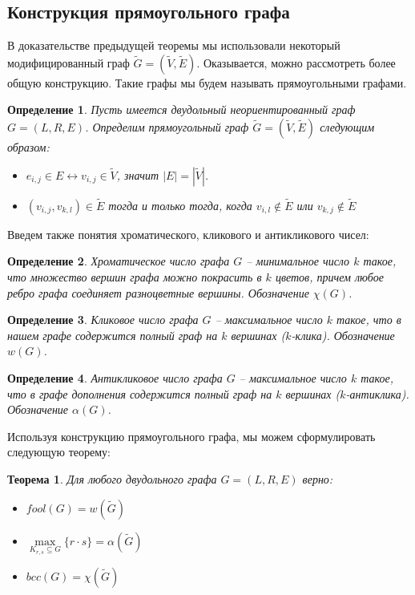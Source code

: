 \documentclass[a4paper]{article}
\newtheorem*{mdefinition}{Определение}
\newtheorem*{mtheorem}{Теорема}
\begin{document}
\subsection{Конструкция прямоугольного графа}

В доказательстве предыдущей теоремы мы использовали некоторый модифицированный граф $\widetilde{G} = 
(\widetilde{V}, \widetilde{E})$. Оказывается, можно рассмотреть более общую конструкцию. Такие графы 
мы будем называть прямоугольными графами.
\begin{mdefinition}
    Пусть имеется двудольный неориентированный граф $G = (L, R, E)$. Определим прямоугольный граф 
    $\widetilde{G} = (\widetilde{V}, \widetilde{E})$ следующим образом:
    \begin{itemize}
        \item $e_{i,j}\in E \leftrightarrow v_{i,j}\in \widetilde{V}$, значит $|E| = |\widetilde{V}|$.
        \item $(v_{i,j}, v_{k, l}) \in \widetilde{E}$ тогда и только тогда, когда $v_{i,l}\notin \widetilde{E}$ 
        или $v_{k,j}\notin\widetilde{E}$
    \end{itemize}
\end{mdefinition}

Введем также понятия хроматического, кликового и антикликового чисел:
\begin{mdefinition}

    Хроматическое число графа $G$ -- минимальное число $k$ такое, что множество вершин графа можно 
    покрасить в $k$ цветов, причем любое ребро графа соединяет разноцветные вершины. Обозначение $\chi(G)$.
\end{mdefinition}
\begin{mdefinition} 
    Кликовое число графа $G$ -- максимальное число $k$ такое, что в нашем графе содержится полный 
    граф на $k$ вершинах ($k$-клика). Обозначение $w(G)$.
\end{mdefinition}
\begin{mdefinition} 
    Антикликовое число графа $G$ -- максимальное число $k$ такое, что в графе дополнения содержится 
    полный граф на $k$ вершинах ($k$-антиклика). Обозначение $\alpha(G)$.
\end{mdefinition}


Используя конструкцию прямоугольного графа, мы можем сформулировать следующую теорему:
\begin{mtheorem}
    Для любого двудольного графа $G = (L, R, E)$ верно:
    \begin{itemize}
        \item[1)] $fool(G) = w(\widetilde{G})$
        \item[2)] $\max\limits_{K_{r,s}\subseteq G}\{r\cdot s\} = \alpha(\widetilde{G})$
        \item[3)] $bcc(G) = \chi(\widetilde{G})$
    \end{itemize}
\end{mtheorem}
\end{document}

